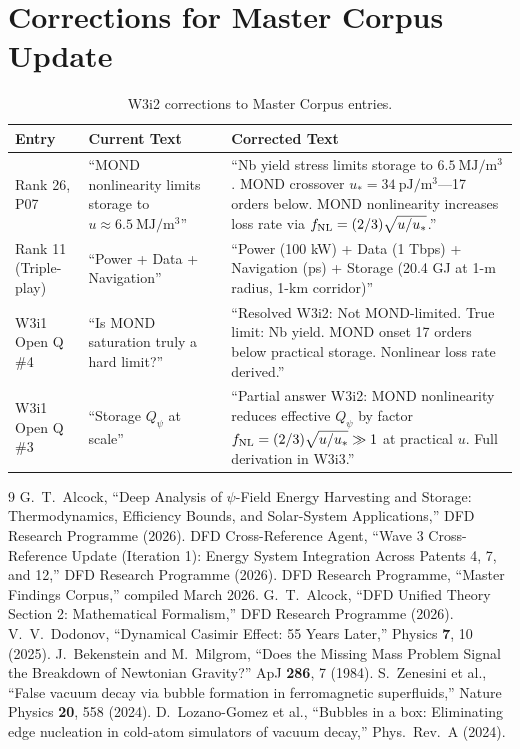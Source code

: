 \documentclass[aps,prd,twocolumn,superscriptaddress]{revtex4-2}
\begin{document}
\section{Corrections for Master Corpus Update}
\label{sec:corpus}

\begin{table}[h]
\caption{W3i2 corrections to Master Corpus entries.}
\label{tab:corpus-corrections}
\begin{ruledtabular}
\begin{tabular}{lp{3.5cm}p{3.5cm}}
Entry & Current Text & Corrected Text \\
\hline
Rank 26, P07 & ``MOND nonlinearity limits storage to $u \approx 6.5~\mathrm{MJ/m^3}$'' &
``Nb yield stress limits storage to $6.5~\mathrm{MJ/m^3}$.  MOND crossover $u_* = 34~\mathrm{pJ/m^3}$---17 orders below.  MOND nonlinearity increases loss rate via $f_{\rm NL} = (2/3)\sqrt{u/u_*}$.'' \\
\hline
Rank 11 (Triple-play) & ``Power + Data + Navigation'' &
``Power (100 kW) + Data (1 Tbps) + Navigation (ps) + Storage (20.4 GJ at 1-m radius, 1-km corridor)'' \\
\hline
W3i1 Open Q \#4 & ``Is MOND saturation truly a hard limit?'' &
``Resolved W3i2: Not MOND-limited.  True limit: Nb yield.  MOND onset 17 orders below practical storage.  Nonlinear loss rate derived.'' \\
\hline
W3i1 Open Q \#3 & ``Storage $Q_\psi$ at scale'' &
``Partial answer W3i2: MOND nonlinearity reduces effective $Q_\psi$ by factor $f_{\rm NL} = (2/3)\sqrt{u/u_*} \gg 1$ at practical $u$.  Full derivation in W3i3.'' \\
\end{tabular}
\end{ruledtabular}
\end{table}

\begin{thebibliography}{9}
 G.~T.~Alcock, ``Deep Analysis of $\psi$-Field Energy
Harvesting and Storage: Thermodynamics, Efficiency Bounds, and Solar-System
Applications,'' DFD Research Programme (2026).
 DFD Cross-Reference Agent, ``Wave 3 Cross-Reference
Update (Iteration 1): Energy System Integration Across Patents 4, 7,
and 12,'' DFD Research Programme (2026).
 DFD Research Programme, ``Master Findings Corpus,''
compiled March 2026.
 G.~T.~Alcock, ``DFD Unified Theory Section 2:
Mathematical Formalism,'' DFD Research Programme (2026).
 V.~V.~Dodonov, ``Dynamical Casimir Effect: 55 Years
Later,'' Physics \textbf{7}, 10 (2025).
 J.~Bekenstein and M.~Milgrom,
``Does the Missing Mass Problem Signal the Breakdown of Newtonian Gravity?''
ApJ \textbf{286}, 7 (1984).
 S.~Zenesini et al., ``False vacuum decay via bubble
formation in ferromagnetic superfluids,'' Nature Physics \textbf{20},
558 (2024).
 D.~Lozano-Gomez et al., ``Bubbles in a box:
Eliminating edge nucleation in cold-atom simulators of vacuum decay,''
Phys.~Rev.~A (2024).
\end{thebibliography}
\end{document}
